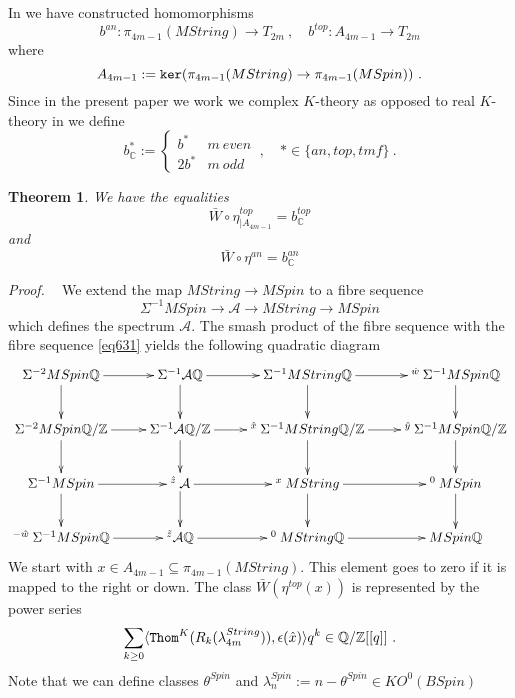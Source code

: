 \documentclass[12pt]{article}
\newtheorem{theorem}{Theorem}[section]
\newcommand{\tmf}{{tmf}}
\newcommand{\Thom}{{\tt Thom}}
\newcommand{\cA}{{\mathcal{A}}}
\renewcommand{\ker}{{\tt ker}}
\newcommand{\proof}{{\it Proof.$\:\:\:\:$}}
\newcommand{\Z}{{\mathbb{Z}}}
\newcommand{\Q}{{\mathbb{Q}}}
\newcommand{\C}{{\mathbb{C}}}
\newcommand{\tM}{{\tt M}}
\begin{document}
 In  \cite[Sec 3.3]{2009arXiv0912.4875B} we have constructed  homomorphisms
 $$b^{an}: \pi_{4m-1}(MString)\to T_{2m}\ ,\quad b^{top}:A_{4m-1}\to T_{2m}$$
 where $$A_{4m-1}:=\ker(\pi_{4m-1}(MString)\to \pi_{4m-1}(MSpin))\ .$$
 Since in the present paper we work we complex $K$-theory as opposed to real $K$-theory  in \cite[Sec 3.3]{2009arXiv0912.4875B}   we define
 \begin{equation}\label{eq2769}b^{*}_{\C}:=\left\{\begin{array}{cc}b^{*} &m\:even\\ 2b^{*}&m\:odd\end{array}\right.\ ,\quad *\in \{an,top,\tmf\}\ .\end{equation}
 \begin{theorem}\label{thm7}
 We have the equalities
$$\bar W\circ \eta^{top}_{|A_{4m-1}}=b^{top}_{\C}$$
 and
 $$\bar W\circ \eta^{an}=b^{an}_{\C}$$
\end{theorem} 
\proof
We extend the map $MString\to MSpin$ to a fibre sequence
$$\Sigma^{-1} MSpin\to \cA \to MString \to MSpin$$ which defines the spectrum
 $\cA$.
The smash product of the fibre sequence with the fibre sequence \eqref{eq631}
yields the following quadratic diagram
$$\xymatrix{\Sigma^{-2}MSpin\Q\ar[d]\ar[r]&\Sigma^{-1}\cA\Q\ar[d]\ar[r]&\Sigma^{-1}MString\Q\ar[d]\ar[r]&{}^{\hat w}\:\Sigma^{-1}MSpin\Q\ar[d]\\
\Sigma^{-2}MSpin\Q/\Z\ar[d]\ar[r]&\Sigma^{-1}\cA\Q/\Z\ar[d]\ar[r]&{}^{\hat x}\:\Sigma^{-1}MString\Q/\Z\ar[d]\ar[r]&{}^{\hat y}\:\Sigma^{-1}MSpin\Q/\Z\ar[d]\\
\Sigma^{-1}MSpin\ar[d]\ar[r]&{}^{\hat z}\:\cA\ar[d]\ar[r]&{}^{x}\:MString\ar[d]\ar[r]&{}^{0}\:MSpin\ar[d]\\{}^{-\hat w}\:
\Sigma^{-1}MSpin\Q\ar[r]&{}^{\tilde z}\cA\Q\ar[r]&{}^{0}\:MString\Q\ar[r]&MSpin\Q}$$
We start with $x\in A_{4m-1}\subseteq \pi_{4m-1}(MString)$. This element goes to zero if it is mapped
to the right or down.  The class
$\bar W(\eta^{top}(x))$
is represented by the power series
\begin{equation}\label{eq1102}\sum_{k\ge 0} \langle \Thom^{K}(R_{k}(\lambda^{String}_{4m})), \epsilon(\hat x) \rangle q^{k}\in  \Q/\Z[[q]] \ .\end{equation}
Note that we can define classes
$\theta^{Spin}$ and $\lambda_{n}^{Spin}:=n-\theta^{Spin}\in KO^{0}(BSpin)$
\end{document}
